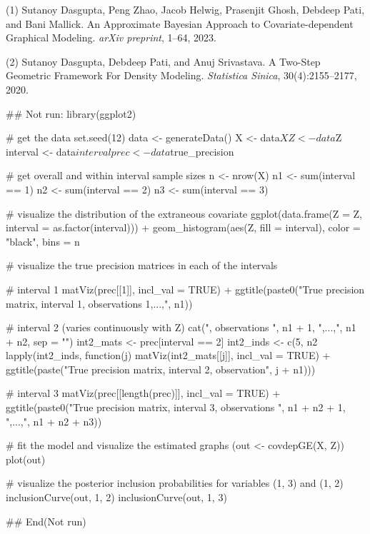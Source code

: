 \documentclass[a4paper]{book}
\begin{document}
%
\begin{References}\relax
(1) Sutanoy Dasgupta, Peng Zhao, Jacob Helwig, Prasenjit Ghosh, Debdeep Pati,
and Bani Mallick. An Approximate Bayesian Approach to Covariate-dependent
Graphical Modeling. \emph{arXiv preprint}, 1–64, 2023.

(2) Sutanoy Dasgupta, Debdeep Pati, and Anuj Srivastava. A Two-Step Geometric
Framework For Density Modeling. \emph{Statistica Sinica}, 30(4):2155–2177, 2020.
\end{References}
%
\begin{Examples}
\begin{ExampleCode}
## Not run: 
library(ggplot2)

# get the data
set.seed(12)
data <- generateData()
X <- data$X
Z <- data$Z
interval <- data$interval
prec <- data$true_precision

# get overall and within interval sample sizes
n <- nrow(X)
n1 <- sum(interval == 1)
n2 <- sum(interval == 2)
n3 <- sum(interval == 3)

# visualize the distribution of the extraneous covariate
ggplot(data.frame(Z = Z, interval = as.factor(interval))) +
  geom_histogram(aes(Z, fill = interval), color = "black", bins = n %

# visualize the true precision matrices in each of the intervals

# interval 1
matViz(prec[[1]], incl_val = TRUE) +
  ggtitle(paste0("True precision matrix, interval 1, observations 1,...,", n1))

# interval 2 (varies continuously with Z)
cat(", observations ", n1 + 1, ",...,", n1 + n2, sep = "")
int2_mats <- prec[interval == 2]
int2_inds <- c(5, n2 %
lapply(int2_inds, function(j) matViz(int2_mats[[j]], incl_val = TRUE) +
         ggtitle(paste("True precision matrix, interval 2, observation", j + n1)))

# interval 3
matViz(prec[[length(prec)]], incl_val = TRUE) +
  ggtitle(paste0("True precision matrix, interval 3, observations ",
                 n1 + n2 + 1, ",...,", n1 + n2 + n3))

# fit the model and visualize the estimated graphs
(out <- covdepGE(X, Z))
plot(out)

# visualize the posterior inclusion probabilities for variables (1, 3) and (1, 2)
inclusionCurve(out, 1, 2)
inclusionCurve(out, 1, 3)

## End(Not run)
\end{ExampleCode}
\end{Examples}
\end{document}
